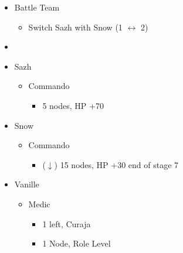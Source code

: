 \begin{menu}
		\begin{itemize}
			\paradigm
			\begin{itemize}
				\item Battle Team
				      \begin{itemize}
					      \item Switch Sazh with Snow (1 $\leftrightarrow$ 2)
				      \end{itemize}
				\item {}%
				      {\paradigmline{(\rav)}{\com}{\com}}%
				      {\paradigmline[2]{\textit{\com}}{\textit{\com}}{\textit{\com}}}%
				      {\paradigmline{(\rav)}{\sen}{(\rav)}}%
				      {\paradigmline{(\com)}{(\sen)}{\med}}%
				      {\paradigmline{\rav}{(\com)}{(\rav)}}%
				      {\paradigmline{\rav}{\rav}{\rav}}
			\end{itemize}
			\crystarium
			\begin{itemize}
				\item Sazh
				      \begin{itemize}
					      \item Commando
					            \begin{itemize}
						            \item 5 nodes, HP +70
					            \end{itemize}
				      \end{itemize}
				\item Snow
				      \begin{itemize}
					      \item Commando
					            \begin{itemize}
						            \item ($\downarrow$) 15 nodes, HP +30 end of stage 7
					            \end{itemize}
				      \end{itemize}
				\item Vanille
				      \begin{itemize}
					      \item Medic
					            \begin{itemize}
						            \item 1 left, Curaja
						            \item 1 Node, Role Level
					            \end{itemize}
				      \end{itemize}
			\end{itemize}

\end{itemize}
\end{menu}

